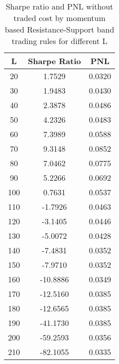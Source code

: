 \documentclass[11pt]{article}
\begin{document}
\begin{table}[ht]
\centering
\begin{tabular}{ccc}
  \hline
L & Sharpe Ratio & PNL \\ 
  \hline
   20 & 1.7529 & 0.0320 \\ 
     30 & 1.9483 & 0.0430 \\ 
     40 & 2.3878 & 0.0486 \\ 
     50 & 4.2326 & 0.0483 \\ 
     60 & 7.3989 & 0.0588 \\ 
     70 & 9.3148 & 0.0852 \\ 
     80 & 7.0462 & 0.0775 \\ 
     90 & 5.2266 & 0.0692 \\ 
    100 & 0.7631 & 0.0537 \\ 
    110 & -1.7926 & 0.0463 \\ 
    120 & -3.1405 & 0.0446 \\ 
    130 & -5.0072 & 0.0428 \\ 
    140 & -7.4831 & 0.0352 \\ 
    150 & -7.9710 & 0.0352 \\ 
    160 & -10.8886 & 0.0349 \\ 
    170 & -12.5160 & 0.0385 \\ 
    180 & -12.6565 & 0.0385 \\ 
    190 & -41.1730 & 0.0385 \\ 
    200 & -59.2593 & 0.0356 \\ 
    210 & -82.1055 & 0.0335 \\  
   \hline
\end{tabular}
\caption{Sharpe ratio and PNL without traded cost by momentum based Resistance-Support band trading rules for different L}\label{RS_notc_mom}
\end{table}
\end{document}
